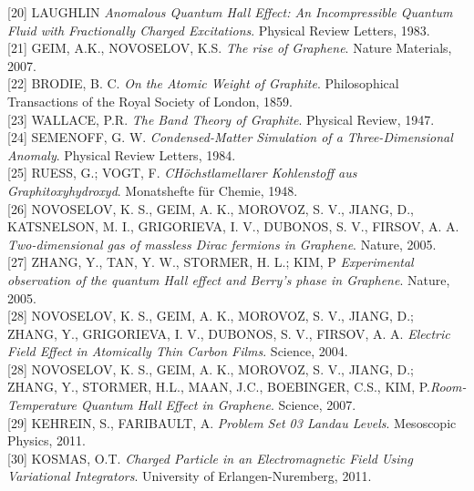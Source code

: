 \documentclass[11pt,letterpaper]{article}     %
\begin{document}
[20] LAUGHLIN \emph{Anomalous Quantum Hall Effect: An Incompressible Quantum Fluid with Fractionally Charged Excitations}. Physical Review Letters, 1983. \\

[21] GEIM, A.K., NOVOSELOV, K.S. \emph{The rise of Graphene}. Nature Materials, 2007. \\

[22] BRODIE, B. C. \emph{On the Atomic Weight of Graphite}. Philosophical Transactions of the Royal Society of London, 1859. \\

[23] WALLACE, P.R. \emph{The Band Theory of Graphite}. Physical Review, 1947. \\

[24] SEMENOFF, G. W. \emph{Condensed-Matter Simulation of a Three-Dimensional Anomaly}. Physical Review Letters, 1984. \\

[25] RUESS, G.; VOGT, F. \emph{CHöchstlamellarer Kohlenstoff aus Graphitoxyhydroxyd}. Monatshefte für Chemie, 1948. \\

[26] NOVOSELOV, K. S., GEIM, A. K., MOROVOZ, S. V., JIANG, D., KATSNELSON, M. I., GRIGORIEVA, I. V., DUBONOS, S. V., FIRSOV, A. A.  \emph{Two-dimensional gas of massless Dirac fermions in Graphene}. Nature, 2005. \\

[27] ZHANG, Y., TAN, Y. W., STORMER, H. L.; KIM, P \emph{Experimental observation of the quantum Hall effect and Berry's phase in Graphene}. Nature, 2005. \\

[28] NOVOSELOV, K. S., GEIM, A. K., MOROVOZ, S. V., JIANG, D.; ZHANG, Y., GRIGORIEVA, I. V., DUBONOS, S. V., FIRSOV, A. A. \emph{Electric Field Effect in Atomically Thin Carbon Films}. Science, 2004. \\

[28] NOVOSELOV, K. S., GEIM, A. K., MOROVOZ, S. V., JIANG, D.; ZHANG, Y., STORMER, H.L., MAAN, J.C., BOEBINGER, C.S., KIM, P.\emph{Room-Temperature Quantum Hall Effect in Graphene}. Science, 2007. \\

[29] KEHREIN, S., FARIBAULT, A. \emph{Problem Set 03 Landau Levels}. Mesoscopic Physics, 2011. \\

[30] KOSMAS, O.T. \emph{Charged Particle in an Electromagnetic Field Using Variational Integrators}. University of Erlangen-Nuremberg, 2011. \\
\end{document}
